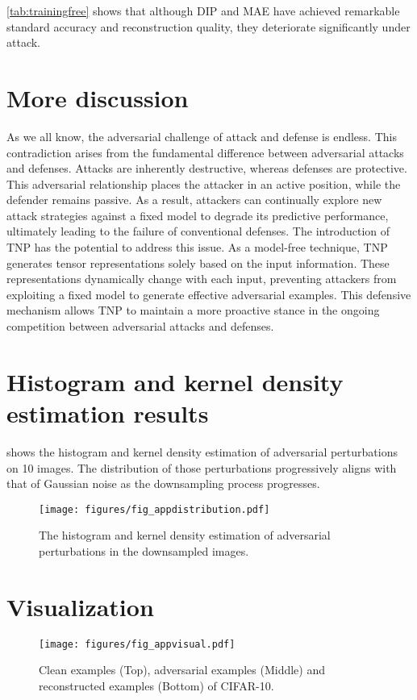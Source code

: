 \cref{tab:trainingfree} shows that although DIP and MAE have achieved remarkable
standard accuracy and reconstruction quality, they deteriorate significantly
under attack.

\section{More discussion}
As we all know, the adversarial challenge of attack and defense is endless. This contradiction arises from the fundamental difference between adversarial attacks and defenses. Attacks are inherently destructive, whereas defenses are protective. This adversarial relationship places the attacker in an active position, while the defender remains passive. As a result, attackers can continually explore new attack strategies against a fixed model to degrade its predictive performance, ultimately leading to the failure of conventional defenses.
The introduction of TNP has the potential to address this issue. As a model-free technique, TNP generates tensor representations solely based on the input information. These representations dynamically change with each input, preventing attackers from exploiting a fixed model to generate effective adversarial examples. This defensive mechanism allows TNP to maintain a more proactive stance in the ongoing competition between adversarial attacks and defenses.


\section{Histogram and kernel density estimation results}
\label{app:distribution}
 shows the histogram and kernel density estimation of adversarial perturbations on 10 images. The distribution of those perturbations progressively aligns with that of Gaussian noise as the downsampling process progresses.
\begin{figure}[ht]
\vskip 0.2in
    \centering
    \texttt{[image: figures/fig\_appdistribution.pdf]}
    \caption{The histogram and kernel density estimation of adversarial perturbations in the downsampled images.}
    \label{fig:app-distribution}
    \vskip -0.1in
\end{figure}


\section{Visualization}
\begin{figure}[ht]
\vskip 0.2in
    \centering
    \texttt{[image: figures/fig\_appvisual.pdf]}
    \caption{Clean examples (Top), adversarial examples (Middle) and reconstructed examples (Bottom) of CIFAR-10.}
    \label{fig:app-visual}
    \vskip -0.1in
\end{figure}




